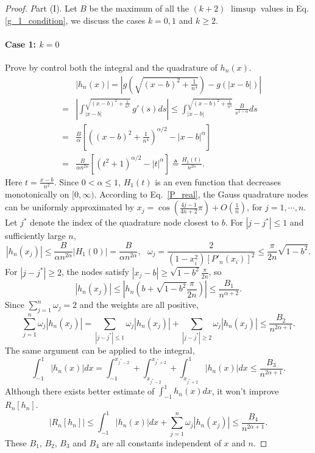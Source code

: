 \documentclass[11pt]{article}
\begin{document}
\begin{proof} {\textit Part (I).}   Let $B$ be the maximum of all the $(k+2)$ $\limsup$ values in Eq. \eqref{g_1_condition}, we discuss the cases $k=0, 1$ and $k\geq 2$.

\paragraph{Case 1: $k=0$} Prove by control both the integral and the quadrature of $h_n(x)$.
\begin{eqnarray}
    &&|h_n(x)|=\left|g(\sqrt{(x-b)^2+\frac{1}{n^4}}) - g(|x-b|)\right| \nonumber\\
    &=& \left| \int_{|x-b|}^{\sqrt{(x-b)^2+\frac{1}{n^4}}} g'(s) ds \right|
    \leq \int_{|x-b|}^{\sqrt{(x-b)^2+\frac{1}{n^4}}} \frac{B}{s^{1-\alpha}} ds \\
    &=& \frac{B}{\alpha} \left[\left((x-b)^2+\frac{1}{n^4}\right)^{\alpha/2} - |x-b|^\alpha \right] \nonumber\\
    &=& \frac{B}{\alpha n^{2\alpha}} \left[\left(t^2+1\right)^{\alpha/2} - |t|^\alpha \right] \triangleq \frac{H_1(t)}{n^{2\alpha}}.
\end{eqnarray}
Here $t=\frac{x-b}{n^2}$. Since $0 < \alpha \leq 1$, $H_1(t)$ is an even function that decreases monotonically on $[0,\infty)$. According to Eq.~\eqref{P_real}, the Gauss quadrature nodes can be uniformly approximated by $x_j = \cos(\frac{4j-1}{4n+2}\pi) + O(\frac{1}{n})$, for $j=1,\cdots,n$. Let $j^*$ denote the index of the quadrature node closest to $b$. For $|j-j^*| \leq 1$ and sufficiently large $n$,
\begin{equation}
    |h_n(x_j)| \leq \frac{B}{\alpha n^{2\alpha}}|H_1(0)| = \frac{B}{\alpha n^{2\alpha}}, \ \ \ \omega_j = \frac{2}{(1-x_i^2)[P'_n(x_i)]^2} \leq \frac{\pi}{2n}\sqrt{1-b^2}.
\end{equation}
For $|j-j^*|\geq 2$, the nodes satisfy $|x_j-b| \geq \sqrt{1-b^2}\frac{\pi}{2n}$, so
\begin{equation}
      |h_n(x_j)| \leq \left|h_n(b+\sqrt{1-b^2}\frac{\pi}{2n})\right| \leq
        \frac{B_1}{n^{\alpha+2}}.
\end{equation}
Since $\sum_{j=1}^n \omega_j = 2$ and the weights are all positive,
\begin{equation}
    \sum_{j=1}^n \omega_j |h_n(x_j)| = \sum_{|j-j^*|\leq 1} \omega_j |h_n(x_j)| + \sum_{|j-j^*|\geq 2} \omega_j |h_n(x_j)| \leq \frac{B_2}{n^{2\alpha+1}}. \label{omega_k=0}
\end{equation}
The same argument can be applied to the integral, 
\begin{equation}
    \int_{-1}^1 |h_n(x)| dx = \int_{-1}^{x_{j^*-2}}+\int_{x_{j^*-2}}^{x_{j^*+2}}+\int_{x_{j^*+2}}^{1} |h_n(x)| dx \leq \frac{B_3}{n^{2\alpha+1}}.
\end{equation}
Although there exists better estimate of $\int_{-1}^1 h_n(x) dx$, it won't improve $R_n[h_n]$. 
\begin{equation}
    |R_n[h_n]| \leq \int_{-1}^1 |h_n(x)| dx + \sum_{j=1}^n \omega_j |h_n(x_j)| \leq \frac{B_4}{n^{2\alpha+1}}. \label{R_h_k=0}
\end{equation}
These $B_1$, $B_2$, $B_3$ and $B_4$ are all constants independent of $x$ and $n$.


\end{proof}
\end{document}
